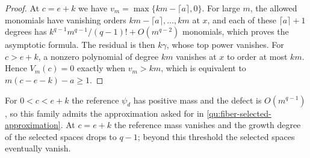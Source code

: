 \begin{proof}
At $c=e+k$ we have $v_m=\max\{km-\lceil a\rceil,0\}$. For large $m$, the allowed monomials have vanishing orders $km-\lceil a\rceil,\ldots,km$ at $x$, and each of these $\lceil a\rceil+1$ degrees has $k^{q-1}m^{q-1}/(q-1)!+O(m^{q-2})$ monomials, which proves the asymptotic formula. The residual is then $k\gamma$, whose top power vanishes. For $c>e+k$, a nonzero polynomial of degree $km$ vanishes at $x$ to order at most $km$. Hence $V_m(c)=0$ exactly when $v_m>km$, which is equivalent to $m(c-e-k)-a\geq1$.
\end{proof}

For $0<c<e+k$ the reference $\psi_d$ has positive mass and the defect is $O(m^{q-1})$, so this family admits the approximation asked for in \cref{qu:fiber-selected-approximation}. At $c=e+k$ the reference mass vanishes and the growth degree of the selected spaces drops to $q-1$; beyond this threshold the selected spaces eventually vanish.
